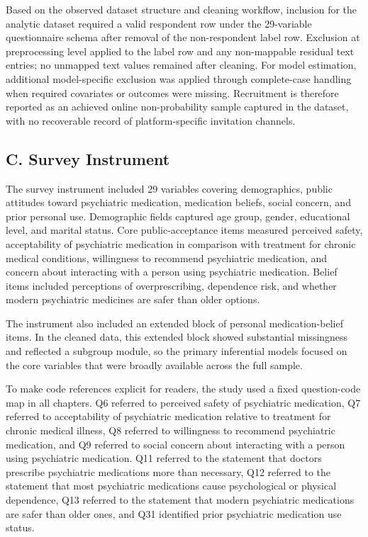 \documentclass[12pt,a4paper]{article}
\begin{document}
Based on the observed dataset structure and cleaning workflow, inclusion for the analytic dataset required a valid respondent row under the 29-variable questionnaire schema after removal of the non-respondent label row. Exclusion at preprocessing level applied to the label row and any non-mappable residual text entries; no unmapped text values remained after cleaning. For model estimation, additional model-specific exclusion was applied through complete-case handling when required covariates or outcomes were missing. Recruitment is therefore reported as an achieved online non-probability sample captured in the dataset, with no recoverable record of platform-specific invitation channels.

\subsection*{C. Survey Instrument}
The survey instrument included 29 variables covering demographics, public attitudes toward psychiatric medication, medication beliefs, social concern, and prior personal use. Demographic fields captured age group, gender, educational level, and marital status. Core public-acceptance items measured perceived safety, acceptability of psychiatric medication in comparison with treatment for chronic medical conditions, willingness to recommend psychiatric medication, and concern about interacting with a person using psychiatric medication. Belief items included perceptions of overprescribing, dependence risk, and whether modern psychiatric medicines are safer than older options.

The instrument also included an extended block of personal medication-belief items. In the cleaned data, this extended block showed substantial missingness and reflected a subgroup module, so the primary inferential models focused on the core variables that were broadly available across the full sample.

To make code references explicit for readers, the study used a fixed question-code map in all chapters. Q6 referred to perceived safety of psychiatric medication, Q7 referred to acceptability of psychiatric medication relative to treatment for chronic medical illness, Q8 referred to willingness to recommend psychiatric medication, and Q9 referred to social concern about interacting with a person using psychiatric medication. Q11 referred to the statement that doctors prescribe psychiatric medications more than necessary, Q12 referred to the statement that most psychiatric medications cause psychological or physical dependence, Q13 referred to the statement that modern psychiatric medications are safer than older ones, and Q31 identified prior psychiatric medication use status.
\end{document}
